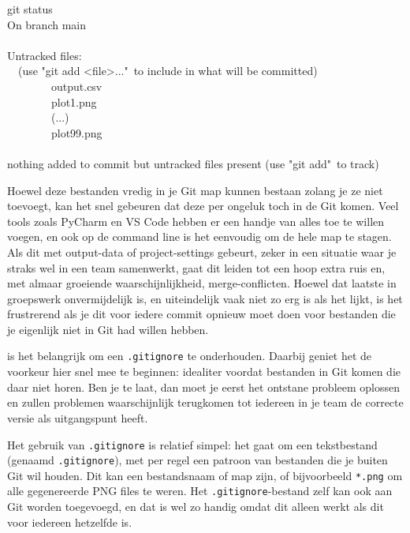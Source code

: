 \begin{bash}
 git status\\
On branch main\\
~ \\
Untracked files:\\
\ \ (use "git add <file>..."\ to include in what will be committed)\\
\ \ \ \ \ \ \ \ output.csv\\
\ \ \ \ \ \ \ \ plot1.png\\
\ \ \ \ \ \ \ \ (...)\\
\ \ \ \ \ \ \ \ plot99.png\\
~ \\
nothing added to commit but untracked files present (use "git add"\ to track)
\end{bash}

Hoewel deze bestanden vredig in je Git map kunnen bestaan zolang je ze niet toevoegt, kan het snel gebeuren dat deze per ongeluk toch in de Git komen. Veel tools zoals PyCharm en VS Code hebben er een handje van alles toe te willen voegen, en ook op de command line is het eenvoudig om de hele map te stagen. Als dit met output-data of project-settings gebeurt, zeker in een situatie waar je straks wel in een team samenwerkt, gaat dit leiden tot een hoop extra ruis en, met almaar groeiende waarschijnlijkheid, merge-conflicten. Hoewel dat laatste in groepswerk onvermijdelijk is, en uiteindelijk vaak niet zo erg is als het lijkt, is het frustrerend als je dit voor iedere commit opnieuw moet doen voor bestanden die je eigenlijk niet in Git had willen hebben. 

 is het belangrijk om een \texttt{.gitignore} te onderhouden. Daarbij geniet het de voorkeur hier snel mee te beginnen: idealiter voordat bestanden in Git komen die daar niet horen. Ben je te laat, dan moet je eerst het ontstane probleem oplossen en zullen problemen waarschijnlijk terugkomen tot iedereen in je team de correcte versie als uitgangspunt heeft.

Het gebruik van \texttt{.gitignore} is relatief simpel: het gaat om een tekstbestand (genaamd \texttt{.gitignore}), met per regel een patroon van bestanden die je buiten Git wil houden. Dit kan een bestandsnaam of map zijn, of bijvoorbeeld \texttt{*.png} om alle gegenereerde PNG files te weren. Het \texttt{.gitignore}-bestand zelf kan ook aan Git worden toegevoegd, en dat is wel zo handig omdat dit alleen werkt als dit voor iedereen hetzelfde is.

